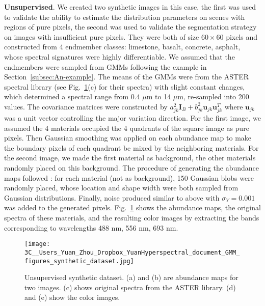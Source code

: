 \documentclass[twocolumn,english]{IEEEtran}
\theoremstyle{plain}
\begin{document}
\textbf{Unsupervised}. We created two synthetic images in this case,
the first was used to validate the ability to estimate the distribution
parameters on scenes with regions of pure pixels, the second was used
to validate the segmentation strategy on images with insufficient
pure pixels. They were both of size $60\times60$ pixels and constructed
from 4 endmember classes: limestone, basalt, concrete, asphalt, whose
spectral signatures were highly differentiable. We assumed that the
endmembers were sampled from GMMs following the example in Section~\ref{subsec:An-example}.
The means of the GMMs were from the ASTER spectral library \cite{baldridge2009aster}
(see Fig.~\ref{fig:synthetic_data}(c) for their spectra) with slight
constant changes, which determined a spectral range from 0.4 $\mu$m
to 14 $\mu$m, re-sampled into 200 values. The covariance matrices
were constructed by $a_{jk}^{2}\mathbf{I}_{B}+b_{jk}^{2}\mathbf{u}_{jk}\mathbf{u}_{jk}^{T}$
where $\mathbf{u}_{jk}$ was a unit vector controlling the major variation
direction. For the first image, we assumed the 4 materials occupied
the 4 quadrants of the square image as pure pixels. Then Gaussian
smoothing was applied on each abundance map to make the boundary pixels
of each quadrant be mixed by the neighboring materials. For the second
image, we made the first material as background, the other materials
randomly placed on this background. The procedure of generating the
abundance maps followed \cite{zhou2016spatial}: for each material
(not as background), 150 Gaussian blobs were randomly placed, whose
location and shape width were both sampled from Gaussian distributions.
Finally, noise produced similar to above with $\sigma_{Y}=0.001$
was added to the generated pixels. Fig.~\ref{fig:synthetic_data}
shows the abundance maps, the original spectra of these materials,
and the resulting color images by extracting the bands corresponding
to wavelengths 488 nm, 556 nm, 693 nm.

\begin{figure}
\begin{centering}
\texttt{[image: 3C\_\_Users\_Yuan\_Zhou\_Dropbox\_YuanHyperspectral\_document\_GMM\_figures\_synthetic\_dataset.jpg]}
\par\end{centering}
\caption{Unsupervised synthetic dataset. (a) and (b) are abundance maps for
two images. (c) shows original spectra from the ASTER library. (d)
and (e) show the color images. }

\label{fig:synthetic_data}
\end{figure}
\end{document}
